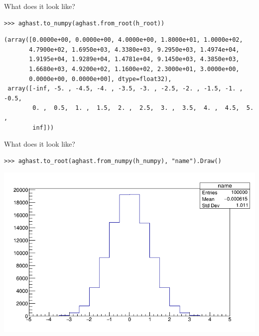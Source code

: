 \documentclass[aspectratio=169]{beamer}
\begin{document}
\begin{frame}[fragile]{What does it look like?}
\small
\begin{verbatim}
>>> aghast.to_numpy(aghast.from_root(h_root))
\end{verbatim}

\scriptsize
\begin{verbatim}
(array([0.0000e+00, 0.0000e+00, 4.0000e+00, 1.8000e+01, 1.0000e+02,
       4.7900e+02, 1.6950e+03, 4.3380e+03, 9.2950e+03, 1.4974e+04,
       1.9195e+04, 1.9289e+04, 1.4781e+04, 9.1450e+03, 4.3850e+03,
       1.6680e+03, 4.9200e+02, 1.1600e+02, 2.3000e+01, 3.0000e+00,
       0.0000e+00, 0.0000e+00], dtype=float32),
 array([-inf, -5. , -4.5, -4. , -3.5, -3. , -2.5, -2. , -1.5, -1. , -0.5,
        0. ,  0.5,  1. ,  1.5,  2. ,  2.5,  3. ,  3.5,  4. ,  4.5,  5. ,
        inf]))
\end{verbatim}

\end{frame}

\begin{frame}[fragile]{What does it look like?}
\vspace{0.5 cm}
\small
\begin{verbatim}
>>> aghast.to_root(aghast.from_numpy(h_numpy), "name").Draw()
\end{verbatim}

\begin{center}
\includegraphics[width=0.65\linewidth]{c1.png}
\end{center}
\end{frame}
\end{document}
